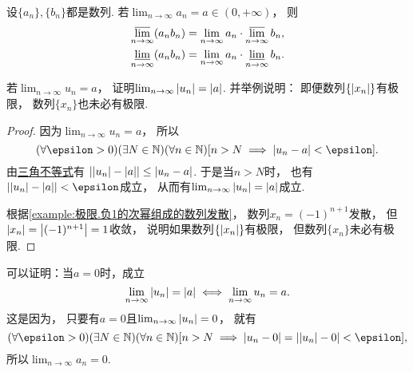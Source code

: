 \begin{example}
设\(\{a_n\},\{b_n\}\)都是数列.
若\(\lim_{n\to\infty} a_n = a \in (0,+\infty)\)，
则\begin{gather*}
	\varlimsup_{n\to\infty} (a_n b_n)
	= \lim_{n\to\infty} a_n \cdot \varlimsup_{n\to\infty} b_n, \\
	\varliminf_{n\to\infty} (a_n b_n)
	= \lim_{n\to\infty} a_n \cdot \varliminf_{n\to\infty} b_n.
\end{gather*}
\end{example}

\begin{example}
若\(\lim_{n\to\infty} u_n = a\)，
证明\(\lim_{n\to\infty} \abs{u_n} = \abs{a}\).
并举例说明：
即便数列\(\{\abs{x_n}\}\)有极限，
数列\(\{x_n\}\)也未必有极限.
\begin{proof}
因为\(\lim_{n\to\infty} u_n = a\)，
所以\[
	(\forall\epsilon>0)
	(\exists N\in\mathbb{N})
	(\forall n\in\mathbb{N})
	[n>N \implies \abs{u_n-a}<\epsilon].
\]
由\hyperref[theorem:不等式.三角不等式2]{三角不等式}有
\(\abs{\abs{u_n}-\abs{a}}\leq\abs{u_n-a}\).
于是当\(n>N\)时，
也有\(\abs{\abs{u_n}-\abs{a}}<\epsilon\)成立，
从而有\(\lim_{n\to\infty} \abs{u_n} = \abs{a}\)成立.

根据\cref{example:极限.负1的次幂组成的数列发散}，
数列\(x_n = (-1)^{n+1}\)发散，
但\(\abs{x_n} = \abs{(-1)^{n+1}} = 1\)收敛，
说明如果数列\(\{\abs{x_n}\}\)有极限，
但数列\(\{x_n\}\)未必有极限.
\end{proof}
\end{example}
\begin{remark}
可以证明：当\(a=0\)时，成立\[
	\lim_{n\to\infty} \abs{u_n} = \abs{a}
	\iff
	\lim_{n\to\infty} u_n = a.
\]
这是因为，
只要有\(a=0\)且\(\lim_{n\to\infty} \abs{u_n} = 0\)，
就有\[
	(\forall\epsilon>0)
	(\exists N\in\mathbb{N})
	(\forall n\in\mathbb{N})
	[n>N \implies \abs{u_n-0}=\abs{\abs{u_n}-0}<\epsilon],
\]
所以\(\lim_{n\to\infty} a_n = 0\).
\end{remark}

